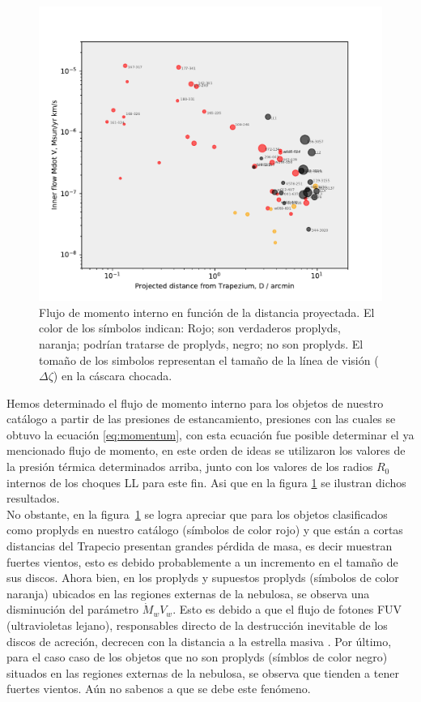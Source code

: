 \begin{figure}
  \centering
  \includegraphics[width=\linewidth, clip]{luis-programas/will-MdotV-vs-D.pdf}
  \caption{Flujo de momento interno  en función de la distancia proyectada. El color de los símbolos indican: Rojo; son verdaderos proplyds, naranja; podrían tratarse de proplyds, negro; no son proplyds. El tomaño de los simbolos representan el tamaño de la línea de visión (\(\Delta\zeta\)) en la cáscara chocada.  }
 \label{fig:flow}
\end{figure}


Hemos determinado el flujo de momento interno para los objetos de nuestro catálogo a partir de las presiones de estancamiento, presiones con las cuales se obtuvo la ecuación \ref{eq:momentum}, con esta ecuación fue posible determinar el ya mencionado flujo de momento, en este orden de ideas se utilizaron los valores de la presión térmica determinados arriba, junto con los valores de los radios \(R_{0}\) internos de los choques LL para este fin. Asi que en la figura \ref{fig:flow} se ilustran dichos resultados.\\

No obstante, en la figura~\ref{fig:flow} se logra apreciar que para los objetos clasificados como proplyds en nuestro catálogo (símbolos de color rojo) y que están a cortas distancias del Trapecio presentan grandes pérdida de masa, es decir  muestran fuertes vientos, esto es debido probablemente a un incremento en el tamaño de sus discos. Ahora bien, en los proplyds y supuestos proplyds (símbolos de color naranja) ubicados en las regiones externas de la nebulosa, se observa una disminución del parámetro \(\dot{M}_{w}V_{w}\). Esto es debido a que el flujo de fotones FUV (ultravioletas lejano), responsables directo de la destrucción inevitable de los discos de acreción, decrecen con la distancia a la estrella masiva \thC{}. Por último, para el caso caso de los objetos que no son proplyds (símblos de color negro) situados en las regiones externas de la nebulosa, se observa que tienden a tener fuertes vientos. Aún no sabenos a que se debe este fenómeno.\\ 


%

%
